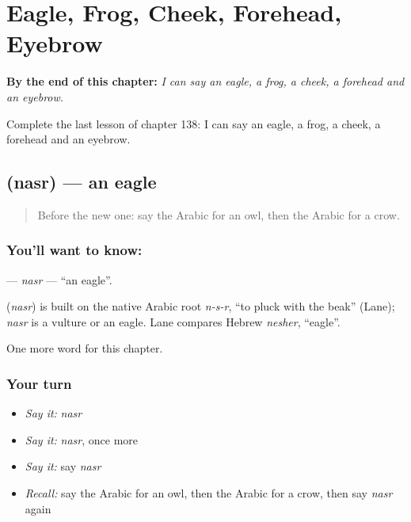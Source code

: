 
\chapter{Eagle, Frog, Cheek, Forehead, Eyebrow}
\label{ch:ar-eagle-frog-cheek-forehead-eyebrow}

\begin{chapteropening}
\textbf{By the end of this chapter:} \emph{I can say an eagle, a frog, a cheek, a forehead and an eyebrow.}

Complete the last lesson of chapter 138: I can say an eagle, a frog, a cheek, a forehead and an eyebrow.
\end{chapteropening}

\section[\texorpdfstring{\ar{نسر} (nasr)}{نسر (nasr)}]{ (nasr) — an eagle}

\label{lesson:AR-C138-nasr}



\begin{quote}
Before the new one: say the Arabic for an owl, then the Arabic for a crow.
\end{quote}

\subsection*{You'll want to know: }
\textbf{} — \emph{nasr} — \textquotedblleft{}an eagle\textquotedblright{}.

\begin{cousinweb}
\textbf{} (\emph{nasr}) is built on the native Arabic root \emph{n-s-r}, \textquotedblleft{}to pluck with the beak\textquotedblright{} (Lane); \emph{nasr} is a vulture or an eagle. Lane compares Hebrew \emph{nesher}, \textquotedblleft{}eagle\textquotedblright{}.
\end{cousinweb}

\begin{grammarlens}[title={What you've built}]
One more word for this chapter.
\end{grammarlens}

\subsection*{Your turn}
\begin{itemize}
\raggedright
  \item \emph{Say it:} \emph{nasr}
  \item \emph{Say it:} \emph{nasr}, once more
  \item \emph{Say it:} say \emph{nasr}
  \item \emph{Recall:} say the Arabic for an owl, then the Arabic for a crow, then say \emph{nasr} again
\end{itemize}

